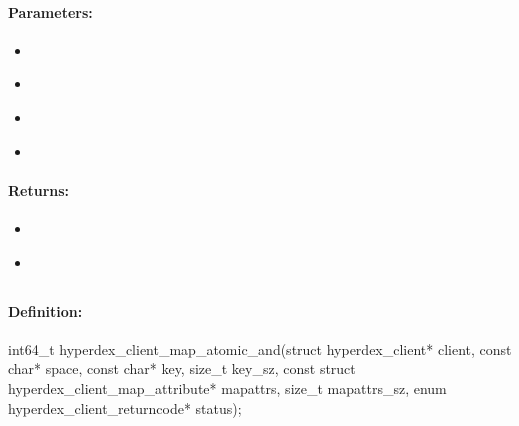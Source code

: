 \paragraph{Parameters:}
\begin{itemize}[noitemsep]
\item {}\\

\item {}\\

\item {}\\

\item {}\\

\end{itemize}

\paragraph{Returns:}
\begin{itemize}[noitemsep]
\item {}\\

\item {}\\

\end{itemize}

\pagebreak
\subsection{}
\label{api:c:map_atomic_and}


\paragraph{Definition:}
\begin{ccode}
int64_t hyperdex_client_map_atomic_and(struct hyperdex_client* client,
        const char* space,
        const char* key, size_t key_sz,
        const struct hyperdex_client_map_attribute* mapattrs, size_t mapattrs_sz,
        enum hyperdex_client_returncode* status);
\end{ccode}

